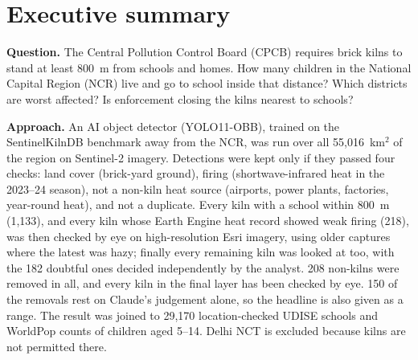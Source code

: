 \documentclass[11pt,a4paper]{article}
\begin{document}
\section*{Executive summary}

\textbf{Question.} The Central Pollution Control Board (CPCB) requires brick
kilns to stand at least 800~m from schools and homes. How many children in the
National Capital Region (NCR) live and go to school inside that distance? Which
districts are worst affected? Is enforcement closing the kilns nearest to
schools?

\textbf{Approach.} An AI object detector (YOLO11-OBB), trained on the
SentinelKilnDB benchmark away from the NCR, was run over all 55{,}016~km$^2$ of
the region on Sentinel-2 imagery. Detections were kept only if they passed four
checks: land cover (brick-yard ground), firing (shortwave-infrared heat in the
2023--24 season), not a non-kiln heat source (airports, power plants, factories,
year-round heat), and not a duplicate. Every kiln with a school within 800~m
(1{,}133), and every kiln whose Earth Engine heat record showed weak firing
(218), was then checked by eye on high-resolution Esri imagery, using older
captures where the latest was hazy; finally every remaining kiln was looked at too,
with the 182 doubtful ones decided independently by the analyst. 208 non-kilns
were removed in all, and every kiln in the final layer has been checked by eye.
150 of the removals rest on Claude's judgement alone, so the headline is also
given as a range. The result was
joined to 29{,}170 location-checked UDISE schools and WorldPop counts of children
aged 5--14. Delhi NCT is excluded because kilns are not permitted there.
\end{document}
